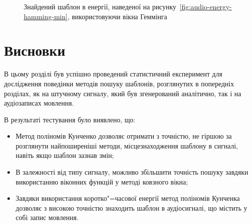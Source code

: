 \begin{figure}[h]

            \caption{Знайдений шаблон в енергії, наведеної на рисунку~\ref{fig:audio-energy-hamming-min},
                використовуючи вікна Геммінга}
            \label{fig:matched-energy-hamming-min-hamming}
        \end{figure}

        \clearpage

\section{Висновки}
    В цьому розділі був успішно проведений статистичний експеримент для дослідження поведінки методів пошуку
    шаблонів, розглянутих в попередніх розділах, як на штучному сигналу, який був згенерований аналітично, так і на
    аудіозаписах мовлення.

    В результаті тестування було виявлено, що:
    \begin{itemize}
        \item Метод поліномів Кунченко дозволяє отримати з точністю, не гіршою за розглянути найпоширеніші методи,
            місцезнаходження шаблону в сигналі, навіть якщо шаблон зазнав змін;
        \item В залежності від типу сигналу, можливо збільшити точність пошуку завдяки використанню віконних функцій у
            методі ковзного вікна;
        \item Завдяки використання коротко"=часової енергії метод поліномів Кунченка дозволяє з високою точністю
            знаходить шаблон в аудіосигналі, що містить у собі запис мовлення.
    \end{itemize}

